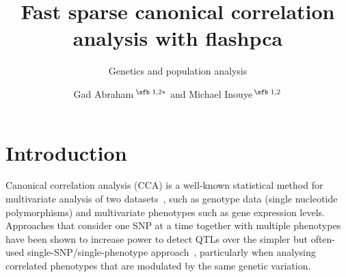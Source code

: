 \documentclass{bioinfo}
\begin{document}

\subtitle{Genetics and population analysis}

\title[Fast SCCA]{Fast sparse canonical correlation analysis with flashpca}
\author[Sample \textit{et~al}.]{Gad Abraham\,$^{\text{\sfb 1,2}*}$
and Michael Inouye\,$^{\text{\sfb 1,2}}$}
\address{$^{\text{\sf 1}}$ Centre for Systems Genomics, School of
BioSciences, University of Melbourne, Parkville 3010, VIC, Australia and \\
$^{\text{\sf 2}}$ Department of Pathology, Faculty of Medicine, Dentistry, and
Health Sciences, University of Melbourne,\\ Parkville 3010, VIC, Australia.}





\maketitle

\section{Introduction}

Canonical correlation analysis (CCA) is a well-known statistical method for
multivariate analysis of two datasets~\citep{Hotelling1936}, such as genotype
data (single nucleotide polymorphisms) and multivariate phenotypes such as gene
expression levels. Approaches that consider one SNP at a time together with
multiple phenotypes have been shown to increase power to detect QTLs over the
simpler but often-used single-SNP/single-phenotype
approach~\citep{Ferreira2009}, particularly when analysing correlated phenotypes
that are modulated by the same genetic variation.
\end{document}

